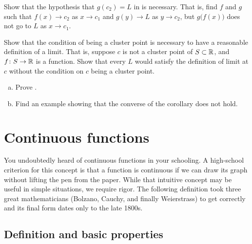 \begin{exercise}[Challenging] \label{exercise:contlimitbadcomposition}
Show that the hypothesis that $g(c_2) = L$ in
 is necessary.  That is, find $f$
and $g$ such that $f(x) \to c_2$ as $x \to c_1$ and
$g(y) \to L$ as $y \to c_2$, but $g\bigl(f(x)\bigr)$ does not go to $L$
as $x \to c_1$.
\end{exercise}

\begin{exercise}
Show that the condition of being a cluster point is necessary to have a
reasonable definition of a limit.  That is, suppose $c$ is not a cluster
point of $S \subset {\mathbb{R}}$, and $f \colon S \to {\mathbb{R}}$ is a function.  Show that
every $L$ would satisfy the definition of limit at $c$ without the condition
on $c$ being a cluster point.
\end{exercise}

\begin{exercise}
\leavevmode
\begin{enumerate}[a)]
\item
Prove .
\item
Find an example showing that the converse of
the corollary does not hold.
\end{enumerate}
\end{exercise}


\sectionnewpage
\section{Continuous functions}
\label{sec:cont}


You undoubtedly heard of continuous functions in your schooling.  A
high-school criterion for this concept is that a function is continuous if
we can draw its graph without lifting the pen from the paper.  While that
intuitive concept may be useful in simple situations, we require
rigor.  The following definition took three great mathematicians
(Bolzano, Cauchy, and finally Weierstrass) to get correctly and its final
form dates only to the late 1800s.

\subsection{Definition and basic properties}

